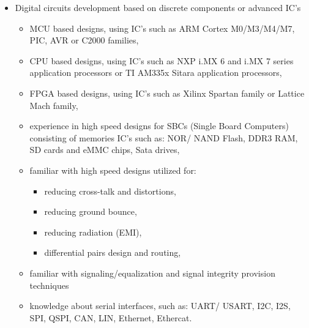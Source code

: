\documentclass{tccv}
\begin{document}
\begin{itemize}
     \item Digital circuits development based on discrete components or advanced IC's
          \begin{itemize}
               \item MCU based designs, using IC's such as ARM Cortex M0/M3/M4/M7, PIC, AVR or C2000 families,
               \item CPU based designs, using IC's such as NXP i.MX 6 and i.MX 7 series application processors or TI AM335x Sitara application processors,
               \item FPGA based designs, using IC's such as Xilinx Spartan family or Lattice Mach family,
               \item experience in high speed designs for SBCs (Single Board Computers) consisting of memories IC's such as: NOR/ NAND Flash, DDR3 RAM, SD cards and eMMC chips, Sata drives,
               \item familiar with high speed designs utilized for: 
                    \begin{itemize}
                    \item reducing cross-talk and distortions, 
                    \item reducing ground bounce, 
                    \item reducing radiation (EMI), 
                    \item differential pairs design and routing,
                    \end{itemize}
               \item familiar with signaling/equalization and signal integrity provision techniques
               \item knowledge about serial interfaces, such as: UART/ USART, I2C, I2S, SPI, QSPI, CAN, LIN, Ethernet, Ethercat.
          \end{itemize}
\end{itemize}
\end{document}

